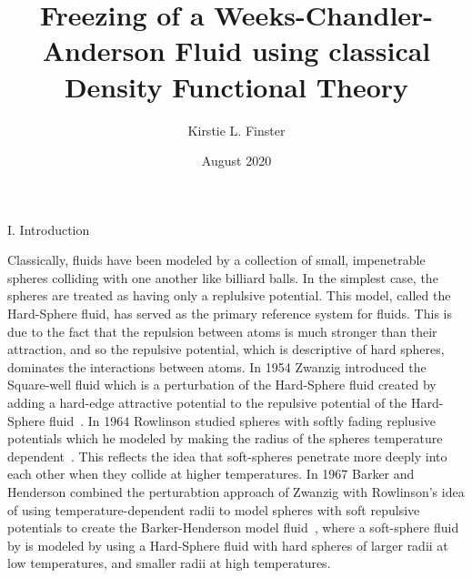 \documentclass[12pt]{article}
\title{Freezing of a Weeks-Chandler-Anderson Fluid using classical Density Functional Theory}
\author{Kirstie L. Finster}
\date{August 2020}
\begin{document}
   \maketitle
   \thispagestyle{fancy}

\noindent I. Introduction

Classically, fluids have been modeled by a collection of small, impenetrable spheres colliding 
with one another like billiard balls. In the simplest case, the spheres are treated as having 
only a replulsive potential. This model, called the Hard-Sphere fluid, has served as the primary 
reference system for fluids. This is due to the fact that the repulsion between atoms is much 
stronger than their attraction, and so the repulsive potential, which is descriptive of 
hard spheres, dominates the interactions between atoms. 
In 1954 Zwanzig introduced the Square-well fluid which is a perturbation of the Hard-Sphere fluid 
created by adding a hard-edge attractive potential to the repulsive potential of the Hard-Sphere 
fluid~\cite{ZwanzigSqrWell}. In 1964 Rowlinson studied spheres with softly fading replusive potentials which he 
modeled by making the radius of the spheres temperature dependent~\cite{rowlinson1964statistical}. 
This reflects the idea that soft-spheres penetrate more deeply into each other 
when they collide at higher temperatures. 
In 1967 Barker and Henderson combined the perturabtion approach of Zwanzig 
with Rowlinson's idea of using temperature-dependent radii to model spheres with 
soft repulsive potentials to create the Barker-Henderson model fluid~\cite{barker1967perturbation}, 
where a soft-sphere fluid by is modeled by using a Hard-Sphere fluid with hard spheres of 
larger radii at low temperatures, and smaller radii at high temperatures. 
%
%
\end{document}
